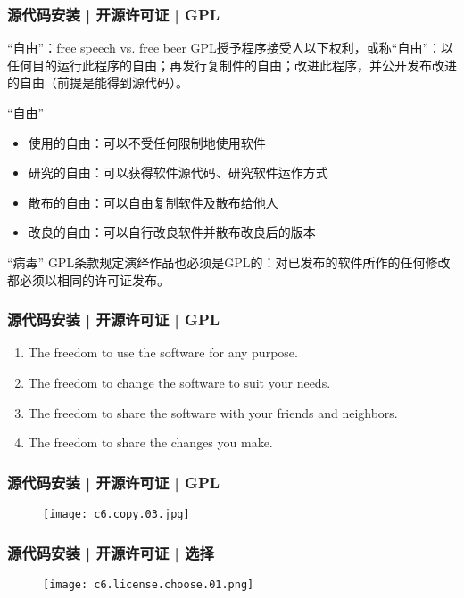 \begin{frame}
  \frametitle{源代码安装 | 开源许可证 | GPL}
  \begin{block}{“自由”：free speech vs. free beer}
    GPL授予程序接受人以下权利，或称“自由”：以任何目的运行此程序的自由；再发行复制件的自由；改进此程序，并公开发布改进的自由（前提是能得到源代码）。
  \end{block}
  \pause
  \begin{block}{\alert{“自由”}}
    \begin{itemize}
      \item 使用的自由：可以不受任何限制地使用软件
      \item 研究的自由：可以获得软件源代码、研究软件运作方式
      \item 散布的自由：可以自由复制软件及散布给他人
      \item 改良的自由：可以自行改良软件并散布改良后的版本
    \end{itemize}
  \end{block}
  \pause
  \begin{block}{“病毒”}
    GPL条款规定演绎作品也必须是GPL的：对已发布的软件所作的任何修改都必须以相同的许可证发布。
  \end{block}
\end{frame}

\begin{frame}
  \frametitle{源代码安装 | 开源许可证 | GPL}
  \begin{enumerate}
    \item The freedom to use the software for any purpose.
    \item The freedom to change the software to suit your needs.
    \item The freedom to share the software with your friends and neighbors.
    \item The freedom to share the changes you make.
  \end{enumerate}
\end{frame}

\begin{frame}
  \frametitle{源代码安装 | 开源许可证 | GPL}
  \begin{figure}
    \centering
    \texttt{[image: c6.copy.03.jpg]}
  \end{figure}
\end{frame}

\begin{frame}
  \frametitle{源代码安装 | 开源许可证 | 选择}
  \begin{figure}
    \centering
    \texttt{[image: c6.license.choose.01.png]}
  \end{figure}
\end{frame}

